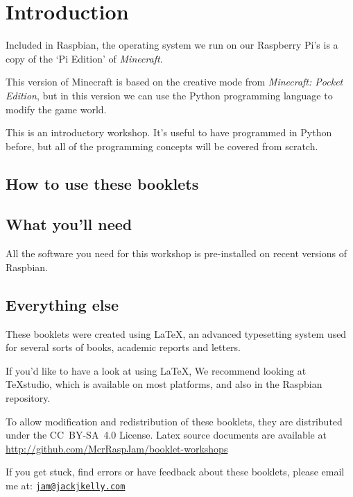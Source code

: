 \setcounter{section}{-1}
\section{Introduction}

	Included in Raspbian, the operating system we run on our Raspberry Pi's is a copy of the `Pi Edition' of \textit{Minecraft}. 
	
	This version of Minecraft is based on the creative mode from \textit{Minecraft: Pocket Edition}, but in this version we can use the Python programming language to modify the game world.
	
	This is an introductory workshop. It's useful to have programmed in Python before,  but all of the programming concepts will be covered from scratch.
		
	\subsection*{How to use these booklets}

	
	
	

	\subsection*{What you'll need}
		All the software you need for this workshop is pre-installed on recent versions of Raspbian.
	\subsection*{Everything else}
	
		These booklets were created using \textrm{\LaTeX}, an advanced typesetting system used for several sorts of books, academic reports and letters.
			
		If you'd like to have a look at using LaTeX, We recommend looking at \TeX studio, which is available on most platforms, and also in the 	Raspbian repository.
		
		To allow modification and redistribution of these booklets, they are distributed under the \hbox{CC BY-SA 4.0} License.
		Latex source documents are available at \url{http://github.com/McrRaspJam/booklet-workshops}
		
		If you get stuck, find errors or have feedback about these booklets, please email me at:
		\href{mailto:jam@jackjkelly.com}{\texttt{jam@jackjkelly.com}}